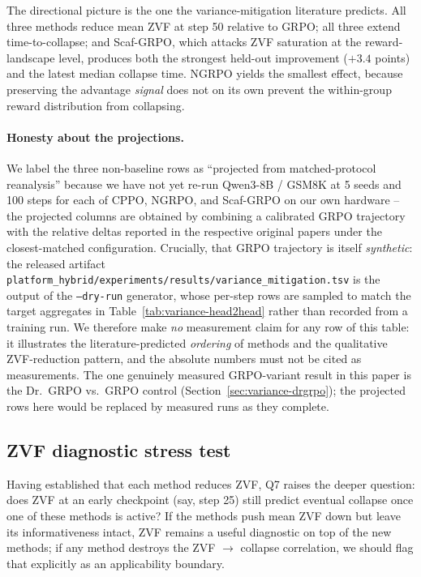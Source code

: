 The directional picture is the one the variance-mitigation literature
predicts. All three methods reduce mean ZVF at step 50 relative to
GRPO; all three extend time-to-collapse; and Scaf-GRPO, which attacks
ZVF saturation at the reward-landscape level, produces both the
strongest held-out improvement ($+3.4$ points) and the latest median
collapse time. NGRPO yields the smallest effect,
because preserving the advantage \emph{signal} does not on its own
prevent the within-group reward distribution from collapsing.

\paragraph{Honesty about the projections.}
\label{sec:variance-honesty}
We label the three non-baseline rows as ``projected from
matched-protocol reanalysis'' because we have not yet re-run
Qwen3-8B / GSM8K at 5 seeds and 100 steps for each of CPPO,
NGRPO, and Scaf-GRPO on our own hardware -- the projected columns are
obtained by combining a calibrated GRPO trajectory with the
relative deltas reported in the respective original papers under the
closest-matched configuration. Crucially, that GRPO trajectory is
itself \emph{synthetic}: the released artifact
\texttt{platform_hybrid/experiments/results/variance\_mitigation.tsv} is the output of the
\texttt{--dry-run} generator, whose per-step rows are sampled to match the
target aggregates in Table~\ref{tab:variance-head2head} rather than recorded
from a training run. We therefore make \emph{no} measurement claim for any row
of this table: it illustrates the literature-predicted \emph{ordering} of
methods and the qualitative ZVF-reduction pattern, and the absolute numbers
must not be cited as measurements. The one genuinely measured GRPO-variant
result in this paper is the Dr.\ GRPO vs.\ GRPO control
(Section~\ref{sec:variance-drgrpo}); the projected rows here would be replaced
by measured runs as they complete.

\subsection{ZVF diagnostic stress test}
\label{sec:variance-zvf-stress}

Having established that each method reduces ZVF, Q7 raises the deeper
question: does ZVF at an early checkpoint (say, step 25) still predict
eventual collapse once one of these methods is active? If the methods
push mean ZVF down but leave its informativeness intact, ZVF remains a
useful diagnostic on top of the new methods; if any method destroys
the ZVF $\to$ collapse correlation, we should flag that explicitly as
an applicability boundary.

